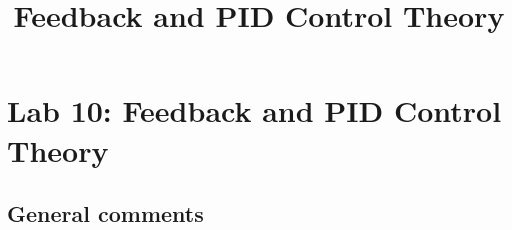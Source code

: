 \documentclass{article}
\title{Feedback and PID Control Theory}
\begin{document}
\maketitle

\section{Lab 10: Feedback and PID Control Theory}

\subsection*{General comments}

\begin{itemize}
\end{itemize}
\end{document}
